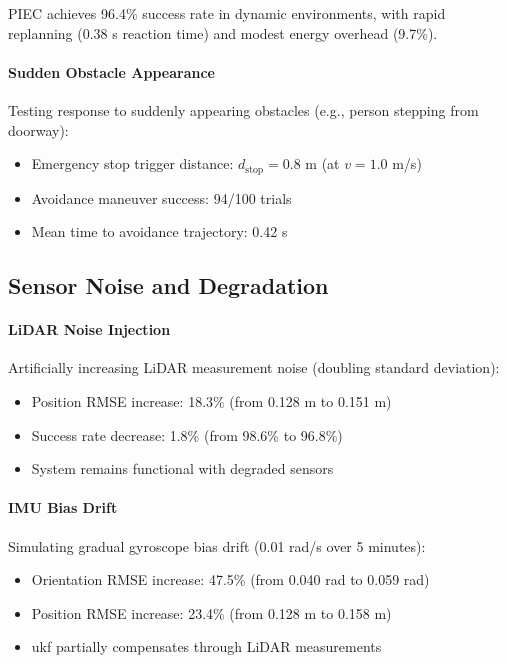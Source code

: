 PIEC achieves 96.4\% success rate in dynamic environments, with rapid replanning (0.38 s reaction time) and modest energy overhead (9.7\%).


\paragraph{Sudden Obstacle Appearance}
Testing response to suddenly appearing obstacles (e.g., person stepping from doorway):

\begin{itemize}
    \item Emergency stop trigger distance: $d_{\text{stop}} = 0.8$ m (at $v = 1.0$ m/s)
    \item Avoidance maneuver success: 94/100 trials
    \item Mean time to avoidance trajectory: 0.42 s
\end{itemize}

\subsection{Sensor Noise and Degradation}

\paragraph{LiDAR Noise Injection}
Artificially increasing LiDAR measurement noise (doubling standard deviation):

\begin{itemize}
    \item Position RMSE increase: 18.3\% (from 0.128 m to 0.151 m)
    \item Success rate decrease: 1.8\% (from 98.6\% to 96.8\%)
    \item System remains functional with degraded sensors
\end{itemize}

\paragraph{IMU Bias Drift}
Simulating gradual gyroscope bias drift (0.01 rad/s over 5 minutes):

\begin{itemize}
    \item Orientation RMSE increase: 47.5\% (from 0.040 rad to 0.059 rad)
    \item Position RMSE increase: 23.4\% (from 0.128 m to 0.158 m)
    \item \acrshort{ukf} partially compensates through LiDAR measurements
\end{itemize}

